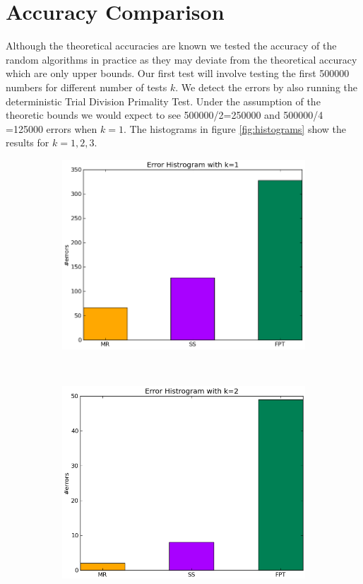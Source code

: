 \documentclass[compressed,final,notitlepage,narroweqnarray,inline,twoside,]{ieee}
\begin{document}
\section{Accuracy Comparison}
Although the theoretical accuracies are known we tested the accuracy of the random algorithms in practice as they may deviate from the theoretical accuracy which are only upper bounds. Our first test will involve testing the first 500000 numbers for different number of tests $k$. We detect the errors by also running the deterministic Trial Division Primality Test. Under the assumption of the theoretic bounds we would expect to see 500000/2=250000 and 500000/4 =125000 errors when $k=1$. The histograms in figure \ref{fig:histograms} show the results for $k=1,2,3$.
\begin{figure}
        \centering
        \begin{subfigure}[b]{0.23\textwidth}
                \includegraphics[width=\textwidth]{../images/Accuracy_k1}
                \label{fig:gull}
        \end{subfigure}%
        ~ 
        \begin{subfigure}[b]{0.23\textwidth}
                \includegraphics[width=\textwidth]{../images/Accuracy_k2}

\end{subfigure}
\end{figure}
\end{document}
